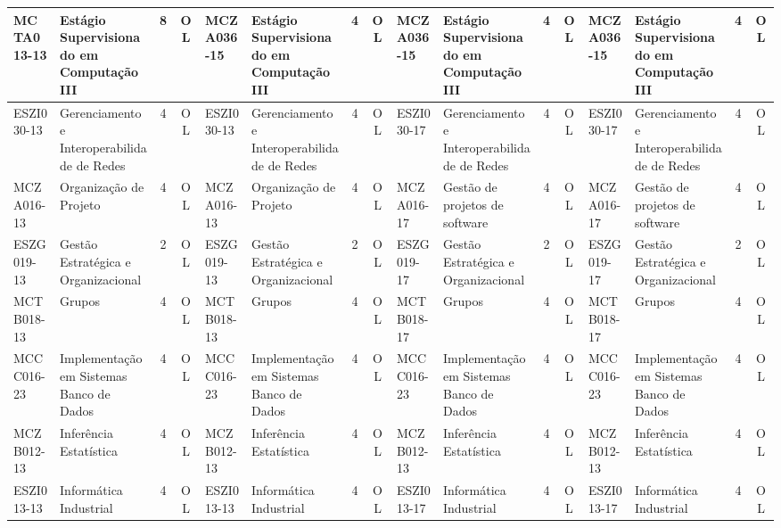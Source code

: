 \documentclass[a4paper]{article}
\begin{document}
\begin{landscape}
{\begin{longtable}{|l|p{.15\textheight}|c|c||l|p{.15\textheight}|c|c||l|p{.15\textheight}|c|c||l|p{.15\textheight}|c|c|}
    MCTA013-13 & Estágio Supervisionado em Computação III & 8 & OL &
    MCZA036-15 & Estágio Supervisionado em Computação III & 4 & OL &
    MCZA036-15 & Estágio Supervisionado em Computação III & 4 & OL &
    MCZA036-15 & Estágio Supervisionado em Computação III & 4 & OL \\ \hline

    ESZI030-13 & Gerenciamento e Interoperabilidade de Redes & 4 & OL &
    ESZI030-13 & Gerenciamento e Interoperabilidade de Redes & 4 & OL &
    ESZI030-17 & Gerenciamento e Interoperabilidade de Redes & 4 & OL &
    ESZI030-17 & Gerenciamento e Interoperabilidade de Redes & 4 & OL \\ \hline

    MCZA016-13 & Organização de Projeto & 4 & OL &
    MCZA016-13 & Organização de Projeto & 4 & OL &
    MCZA016-17 & Gestão de projetos de software & 4 & OL & 
    MCZA016-17 & Gestão de projetos de software & 4 & OL \\ \hline

    ESZG019-13 & Gestão Estratégica e Organizacional & 2 & OL &
    ESZG019-13 & Gestão Estratégica e Organizacional & 2 & OL &
    ESZG019-17 & Gestão Estratégica e Organizacional & 2 & OL &
    ESZG019-17 & Gestão Estratégica e Organizacional & 2 & OL \\ \hline

    MCTB018-13 & Grupos & 4 & OL &
    MCTB018-13 & Grupos & 4 & OL &
    MCTB018-17 & Grupos & 4 & OL &
    MCTB018-17 & Grupos & 4 & OL \\ \hline

    MCCC016-23 & Implementação em Sistemas Banco de Dados & 4 & OL &
    MCCC016-23 & Implementação em Sistemas Banco de Dados & 4 & OL &
    MCCC016-23 & Implementação em Sistemas Banco de Dados & 4 & OL &
    MCCC016-23 & Implementação em Sistemas Banco de Dados & 4 & OL \\ \hline

    MCZB012-13 & Inferência Estatística & 4 & OL &
    MCZB012-13 & Inferência Estatística & 4 & OL &
    MCZB012-13 & Inferência Estatística & 4 & OL &
    MCZB012-13 & Inferência Estatística & 4 & OL \\ \hline

    ESZI013-13 & Informática Industrial & 4 & OL &
    ESZI013-13 & Informática Industrial & 4 & OL &
    ESZI013-17 & Informática Industrial & 4 & OL & 
    ESZI013-17 & Informática Industrial & 4 & OL \\ \hline


\end{longtable}}
\end{landscape}
\end{document}
